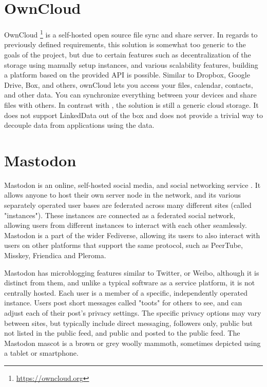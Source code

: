 \section{OwnCloud}

OwnCloud \footnote{\url{https://owncloud.org}} is a self-hosted open source file sync and share server. In regards to previously defined requirements, this solution is somewhat too generic to the goals of the project, but due to certain features such as decentralization of the storage using manually setup instances, and various scalability features, building a platform based on the provided API is possible. Similar to Dropbox, Google Drive, Box, and others, ownCloud lets you access your files, calendar, contacts, and other data. You can synchronize everything between your devices and share files with others. In contrast with \solid{}, the solution is still a generic cloud storage. It does not support LinkedData out of the box and does not provide a trivial way to decouple data from applications using the data. 

\section{Mastodon}

Mastodon is an online, self-hosted social media, and social networking service \cite{mastodon}. It allows anyone to host their own server node in the network, and its various separately operated user bases are federated across many different sites (called "instances"). These instances are connected as a federated social network, allowing users from different instances to interact with each other seamlessly. Mastodon is a part of the wider Fediverse, allowing its users to also interact with users on other platforms that support the same protocol, such as PeerTube, Misskey, Friendica and Pleroma.

Mastodon has microblogging features similar to Twitter, or Weibo, although it is distinct from them, and unlike a typical software as a service platform, it is not centrally hosted. Each user is a member of a specific, independently operated instance. Users post short messages called "toots" for others to see, and can adjust each of their post's privacy settings. The specific privacy options may vary between sites, but typically include direct messaging, followers only, public but not listed in the public feed, and public and posted to the public feed. The Mastodon mascot is a brown or grey woolly mammoth, sometimes depicted using a tablet or smartphone.

